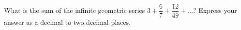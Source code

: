 What is the sum of the infinite geometric series $3+\dfrac{6}{7}+\dfrac{12}{49}+\dots$? Express your answer as a decimal to two decimal places.
